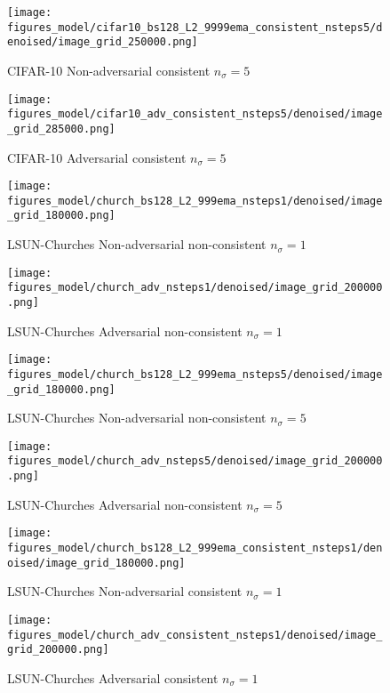 \documentclass{article} \usepackage{iclr2021_conference_notitle,times}
\theoremstyle{definition}
\theoremstyle{definition}
\begin{document}
\begin{figure}[ht] 
    \centering
    \texttt{[image: figures\_model/cifar10\_bs128\_L2\_9999ema\_consistent\_nsteps5/denoised/image\_grid\_250000.png]}
    \caption{CIFAR-10 Non-adversarial consistent $n_\sigma=5$} 
\end{figure}
\begin{figure}[ht] 
    \centering
    \texttt{[image: figures\_model/cifar10\_adv\_consistent\_nsteps5/denoised/image\_grid\_285000.png]}
    \caption{CIFAR-10 Adversarial consistent $n_\sigma=5$} 
\end{figure}



\begin{figure}[ht] 
    \centering
    \texttt{[image: figures\_model/church\_bs128\_L2\_999ema\_nsteps1/denoised/image\_grid\_180000.png]}
    \caption{LSUN-Churches Non-adversarial non-consistent $n_\sigma=1$} 
\end{figure}
\begin{figure}[ht] 
    \centering
    \texttt{[image: figures\_model/church\_adv\_nsteps1/denoised/image\_grid\_200000.png]}
    \caption{LSUN-Churches Adversarial non-consistent $n_\sigma=1$} 
\end{figure}

\begin{figure}[ht] 
    \centering
    \texttt{[image: figures\_model/church\_bs128\_L2\_999ema\_nsteps5/denoised/image\_grid\_180000.png]}
    \caption{LSUN-Churches Non-adversarial non-consistent $n_\sigma=5$} 
\end{figure}
\begin{figure}[ht] 
    \centering
    \texttt{[image: figures\_model/church\_adv\_nsteps5/denoised/image\_grid\_200000.png]}
    \caption{LSUN-Churches Adversarial non-consistent $n_\sigma=5$} 
\end{figure}

\begin{figure}[ht] 
    \centering
    \texttt{[image: figures\_model/church\_bs128\_L2\_999ema\_consistent\_nsteps1/denoised/image\_grid\_180000.png]}
    \caption{LSUN-Churches Non-adversarial consistent $n_\sigma=1$} 
\end{figure}
\begin{figure}[ht] 
    \centering
    \texttt{[image: figures\_model/church\_adv\_consistent\_nsteps1/denoised/image\_grid\_200000.png]}
    \caption{LSUN-Churches Adversarial consistent $n_\sigma=1$} 
\end{figure}
\end{document}
